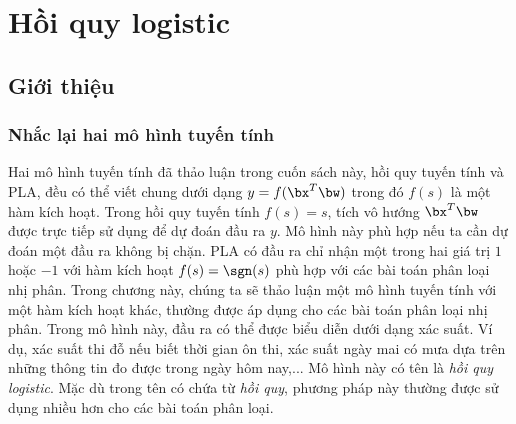 \chapter{Hồi quy logistic}
\label{cha:logisticregression}
\section{Giới thiệu}
 
\subsection{Nhắc lại hai mô hình tuyến tính}
Hai mô hình tuyến tính đã thảo luận trong cuốn sách này, hồi quy tuyến tính và
PLA, đều có thể viết chung dưới dạng $y = f(\bx^T\bw)$ trong đó $f(s)$ là một
hàm kích hoạt. Trong hồi quy tuyến tính $f(s) = s$, tích vô hướng $\bx^T\bw$
được trực tiếp sử dụng để dự đoán đầu ra $y$. Mô hình này phù hợp nếu ta cần dự
đoán một đầu ra không bị chặn. PLA có đầu ra chỉ nhận một trong hai giá trị $1$
hoặc $-1$ với hàm kích hoạt $f(s) = \sgn(s)$ phù hợp với các bài toán phân loại
nhị phân. Trong chương này, chúng ta sẽ thảo luận một mô hình tuyến tính với một
hàm kích hoạt khác, thường được áp dụng cho các bài toán phân loại nhị phân.
Trong mô hình này, đầu ra có thể được biểu diễn dưới dạng xác suất. Ví dụ, xác
suất thi đỗ nếu biết thời gian ôn thi, xác suất ngày mai có mưa dựa trên những
thông tin đo được trong ngày hôm nay,... Mô hình này có tên là \textit{hồi quy
logistic}. Mặc dù trong tên có chứa từ \textit{hồi quy}, phương pháp này thường
được sử dụng nhiều hơn cho các bài toán phân loại.
 
 
